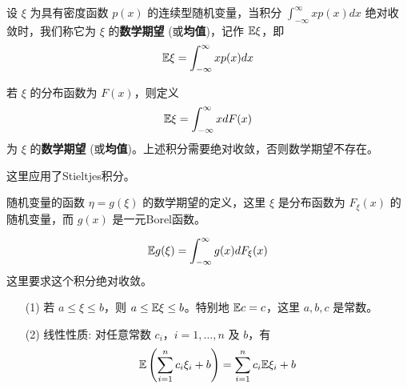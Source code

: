 \begin{definition}[连续型随机变量的数学期望] \label{def:mathematical_expectation_continuous}
设 $\xi$ 为具有密度函数 $p(x)$ 的连续型随机变量，当积分 $\int_{-\infty}^\infty xp(x)dx$ 绝对收敛时，我们称它为 $\xi$ 的\textbf{数学期望} (或\textbf{均值})，记作 $\mathbb{E}\xi$，即
\begin{equation} \label{eq:mathematical_expectation_integral}
\mathbb{E}\xi = \int_{-\infty}^\infty xp(x) dx
\end{equation}
\end{definition}
\begin{definition}[一般情形下的数学期望] \label{def:mathematical_expectation_general}
若 $\xi$ 的分布函数为 $F(x)$，则定义
\begin{equation} \label{eq:mathematical_expectation_stieltjes_integral}
\mathbb{E}\xi = \int_{-\infty}^\infty xdF(x)
\end{equation}
为 $\xi$ 的\textbf{数学期望} (或\textbf{均值})。上述积分需要绝对收敛，否则数学期望不存在。
\end{definition}
\begin{remark}
    这里应用了Stieltjes积分。
\end{remark}
随机变量的函数 $\eta=g(\xi)$ 的数学期望的定义，这里 $\xi$ 是分布函数为 $F_\xi(x)$ 的随机变量，而 $g(x)$ 是一元Borel函数。
\begin{proposition} \label{prop:anonymous_statistician_formula}
\begin{equation} \label{eq:expectation_of_function_of_rv}
\mathbb{E} g(\xi) = \int_{-\infty}^\infty g(x)dF_\xi(x)
\end{equation}
这里要求这个积分绝对收敛。
\end{proposition}
\begin{proposition} \label{prop:expectation_properties}
\begin{itemize}
    \item [(1)] 若 $a\le\xi\le b$，则 $a \le \mathbb{E}\xi \le b$。特别地 $\mathbb{E} c=c$，这里 $a,b,c$ 是常数。
    \item [(2)] 线性性质: 对任意常数 $c_i，i=1,\ldots,n$ 及 $b$，有
\[
\mathbb{E}\left(\sum_{i=1}^n c_i \xi_i + b\right) = \sum_{i=1}^n c_i \mathbb{E}\xi_i + b
\]
\end{itemize}
\end{proposition}
